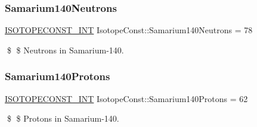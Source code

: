 \subsubsection{\texorpdfstring{Samarium140\+Neutrons}{Samarium140Neutrons}}
{\footnotesize\ttfamily \mbox{\hyperlink{group___isotope_const-_macros_ga5f18360b3e99483a35c32d789e62621c}{I\+S\+O\+T\+O\+P\+E\+C\+O\+N\+S\+T\+\_\+\+I\+NT}} Isotope\+Const\+::\+Samarium140\+Neutrons = 78}

\$ \$ Neutrons in Samarium-\/140. \mbox{\label{group___isotope_const-_samarium-_sm140_ga652611c642fb2a06ed070c67fb635d49}} 
\subsubsection{\texorpdfstring{Samarium140\+Protons}{Samarium140Protons}}
{\footnotesize\ttfamily \mbox{\hyperlink{group___isotope_const-_macros_ga5f18360b3e99483a35c32d789e62621c}{I\+S\+O\+T\+O\+P\+E\+C\+O\+N\+S\+T\+\_\+\+I\+NT}} Isotope\+Const\+::\+Samarium140\+Protons = 62}

\$ \$ Protons in Samarium-\/140. 